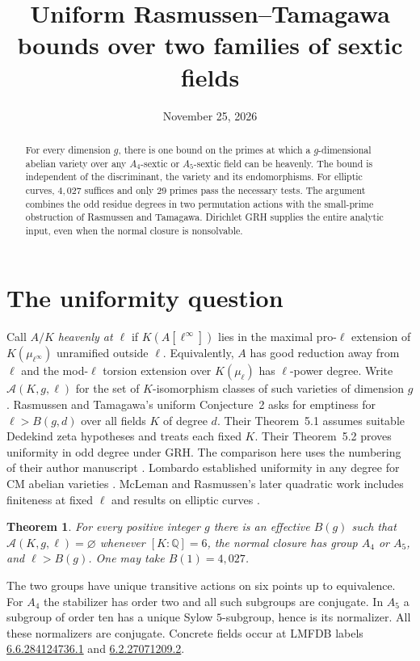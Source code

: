 \documentclass[11pt]{article}
\title{Uniform Rasmussen--Tamagawa bounds over two families of sextic fields}
\author{}
\date{November 25, 2026}
\newtheorem{theorem}{Theorem}
\newcommand{\Q}{\mathbb Q}
\newcommand{\A}{\mathcal A}
\begin{document}
\maketitle
\begin{abstract}
For every dimension $g$, there is one bound on the primes at which a
$g$-dimensional abelian variety over any $A_4$-sextic or $A_5$-sextic
field can be heavenly. The bound is independent of the discriminant, the
variety and its endomorphisms. For elliptic curves, $4{,}027$ suffices and only 29 primes pass the necessary tests.
The argument combines the odd residue degrees in two permutation
actions with the small-prime obstruction of Rasmussen and Tamagawa.
Dirichlet GRH supplies the entire analytic input, even when the
normal closure is nonsolvable.
\end{abstract}

\section{The uniformity question}

Call $A/K$ \emph{heavenly at $\ell$} if $K(A[\ell^\infty])$ lies in the
maximal pro-$\ell$ extension of $K(\mu_{\ell^\infty})$ unramified
outside $\ell$. Equivalently, $A$ has good reduction away from
$\ell$ and the mod-$\ell$ torsion extension over $K(\mu_\ell)$ has
$\ell$-power degree. Write $\A(K,g,\ell)$ for the set of
$K$-isomorphism classes of such varieties of dimension $g$.
Rasmussen and Tamagawa's uniform Conjecture~2 asks for emptiness for
$\ell>B(g,d)$ over all fields $K$ of degree $d$.
Their Theorem~5.1 assumes suitable Dedekind zeta hypotheses and treats
each fixed $K$. Their Theorem~5.2 proves uniformity in odd degree under
GRH. The comparison here uses the numbering of their author manuscript
\cite{rt}. Lombardo established uniformity in any degree for CM
abelian varieties \cite{lombardo}. McLeman and Rasmussen's later
quadratic work includes finiteness at fixed $\ell$ and results on
elliptic curves \cite{mcr}.

\begin{theorem}\label{main}
For every positive integer $g$ there is an effective $B(g)$ such that
$\A(K,g,\ell)=\varnothing$ whenever $[K:\Q]=6$, the normal closure
has group $A_4$ or $A_5$, and $\ell>B(g)$. One may take $B(1)=4{,}027$.
\end{theorem}
The two groups have unique transitive actions on six points up to
equivalence. For $A_4$ the stabilizer has order two and all such
subgroups are conjugate. In $A_5$ a subgroup of order ten has a unique
Sylow $5$-subgroup, hence is its normalizer. All these normalizers are
conjugate. Concrete fields occur at LMFDB labels
\href{https://www.lmfdb.org/NumberField/6.6.284124736.1}{6.6.284124736.1}
and \href{https://www.lmfdb.org/NumberField/6.2.27071209.2}{6.2.27071209.2}.
\end{document}
